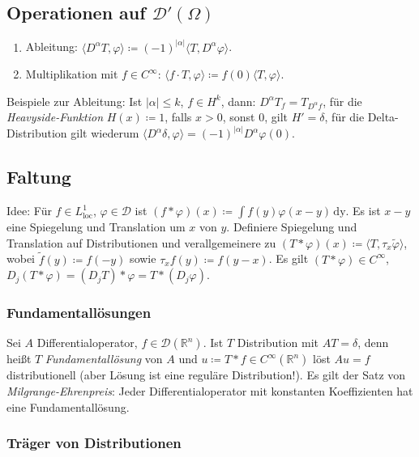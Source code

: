 \documentclass[11pt,a4paper]{scrartcl}
\newcommand{\R}{\mathbb{R}} %
\newcommand{\D}{\mathcal{D}}
\theoremstyle{plain}
\theoremstyle{definition}
\theoremstyle{remark}
\DeclareMathOperator{\loc}{loc}
\begin{document}
\subsection{Operationen auf $\D'(\Omega)$}

\begin{enumerate}
    \item Ableitung: $\langle D^\alpha T, \varphi \rangle \coloneqq (-1)^{|\alpha|} \langle T, D^\alpha \varphi \rangle$.
    \item Multiplikation mit $f\in C^\infty$: $\langle f\cdot T, \varphi \rangle \coloneqq f(0) \langle T, \varphi \rangle$.
\end{enumerate}

Beispiele zur Ableitung: Ist $|\alpha| \leq k$, $f\in H^k$, dann: $D^\alpha T_f = T_{D^\alpha f}$, für die \emph{Heavyside-Funktion} $H(x)\coloneqq 1$, falls $x>0$, sonst $0$, gilt $H'=\delta$, für die Delta-Distribution gilt wiederum $\langle D^\alpha \delta, \varphi \rangle = (-1)^{|\alpha|} D^\alpha \varphi(0)$.

\subsection{Faltung}

Idee: Für $f\in L^1_{\loc}$, $\varphi\in \D$ ist $(f*\varphi)(x)\coloneqq \int f(y)\varphi(x-y) \, \mathrm{dy}$. Es ist $x-y$ eine Spiegelung und Translation um $x$ von $y$. Definiere Spiegelung und Translation auf Distributionen und verallgemeinere zu $(T*\varphi)(x)\coloneqq \langle T, \tau_x \tilde\varphi \rangle$, wobei $\tilde f(y) \coloneqq f(-y)$ sowie $\tau_x f(y) \coloneqq f(y-x)$. Es gilt $(T*\varphi)\in C^\infty$, $D_j (T*\varphi) = (D_j T)*\varphi = T*(D_j \varphi)$.

\subsubsection{Fundamentallösungen}

Sei $A$ Differentialoperator, $f\in \D(\R^n)$. Ist $T$ Distribution mit $AT=\delta$, denn heißt $T$ \emph{Fundamentallösung} von $A$ und $u\coloneqq T*f \in C^\infty(\R^n)$ löst $Au=f$ distributionell (aber Lösung ist eine reguläre Distribution!). Es gilt der Satz von \emph{Milgrange-Ehrenpreis}: Jeder Differentialoperator mit konstanten Koeffizienten hat eine Fundamentallösung.

\subsubsection{Träger von Distributionen}
\end{document}
